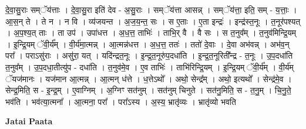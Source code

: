 \documentclass[17pt]{extarticle}
\begin{document}
दे॒वा॒सु॒राः सम्ॅय॑त्ताः । दे॒वा॒सु॒रा इति॑ देव - अ॒सु॒राः । सम्ॅय॑त्ता आसन्न् । सम्ॅय॑त्ता॒ इति॒ सम् - य॒त्ताः॒ । आ॒स॒न् ते । ते न । न वि । व्य॑जयन्त । अ॒ज॒य॒न्त॒ सः । स ए॒ताः । ए॒ता इन्द्रः॑ । इन्द्र॑स्त॒नूः । त॒नूर॑पश्यत् । अ॒प॒श्य॒त् ताः । ता उप॑ । उपा॑धत्त । अ॒ध॒त्त॒ ताभिः॑ । ताभि॒र् वै । वै सः । स त॒नुव᳚म् । त॒नुव॑मिन्द्रि॒यम् । इ॒न्द्रि॒यम् ॅवी॒र्य᳚म् । वी॒र्य॑मा॒त्मन्न् । आ॒त्मन्न॑धत्त । अ॒ध॒त्त॒ ततः॑ । ततो॑ दे॒वाः । दे॒वा अभ॑वन्न् । अभ॑व॒न् परा᳚ । पराऽसु॑राः । असु॑रा॒ यत् । यदि॑न्द्रत॒नूः । इ॒न्द्र॒त॒नूरु॑प॒दधा॑ति । इ॒न्द्र॒त॒नूरिती᳚न्द्र - त॒नूः । उ॒प॒दधा॑ति त॒नुव᳚म् । उ॒प॒दधा॒तीत्यु॑प - दधा॑ति । त॒नुव॑मे॒व । ए॒व ताभिः॑ । ताभि॑रिन्द्रि॒यम् । इ॒न्द्रि॒यम् ॅवी॒र्य᳚म् । वी॒र्य॑म् ॅयज॑मानः । यज॑मान आ॒त्मन्न् । आ॒त्मन् ध॑त्ते । ध॒त्तेऽथो᳚ । अथो॒ सेन्द्र᳚म् । अथो॒ इत्यथो᳚ । सेन्द्र॑मे॒व । सेन्द्र॒मिति॒ स - इ॒न्द्र॒म् । ए॒वाग्निम् । अ॒ग्निꣳ सत॑नुम् । सत॑नुम् चिनुते । सत॑नु॒मिति॒ स - त॒नु॒म् । चि॒नु॒ते॒ भव॑ति । भव॑त्या॒त्मना᳚ । आ॒त्मना॒ परा᳚ । परा᳚ऽस्य । अ॒स्य॒ भ्रातृ॑व्यः । भ्रातृ॑व्यो भवति \newline

\textbf{Jatai Paata} \newline
\end{document}
